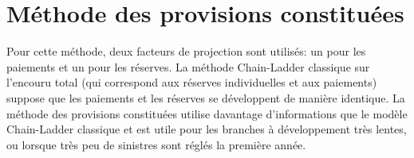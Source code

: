 \section{Méthode des provisions constituées}
\label{sec:deterministe:provisions-constituees}

Pour cette méthode, deux facteurs de projection sont utilisés: un pour
les paiements et un pour les réserves. La méthode Chain-Ladder
classique sur l'encouru total (qui correspond aux réserves
individuelles et aux paiements) suppose que les paiements et les
réserves se développent de manière identique. La méthode des
provisions constituées utilise davantage d'informations que le modèle
Chain-Ladder classique et est utile pour les branches à développement
très lentes, ou lorsque très peu de sinistres sont réglés la première
année.

